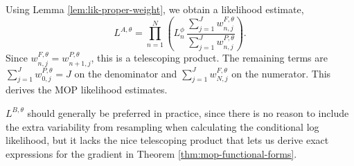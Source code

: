 Using Lemma \ref{lem:lik-proper-weight}, we obtain a likelihood estimate,
\[
L^{A,\theta} = \prod_{n=1}^N \left( L^\phi_n \, \frac{\sum_{j=1}^J w^{F,\theta}_{n,j}}{\sum_{j=1}^J w^{P,\theta}_{n,j}}\right).
\]
Since $w^{F,\theta}_{n,j}=w^{P,\theta}_{n+1,j}$, this is a telescoping product. The remaining terms are
$\sum_{j=1}^J w^{P,\theta}_{0,j} = J$ on the denominator and $\sum_{j=1}^J w^{F,\theta}_{N,j}$ on the numerator.
This derives the MOP likelihood estimates.


$L^{B,\theta}$ should generally be preferred in practice, since there is no reason to include the extra variability from resampling when calculating the conditional log likelihood, but it lacks the nice telescoping product that lets us derive exact expressions for the gradient in Theorem \ref{thm:mop-functional-forms}.
